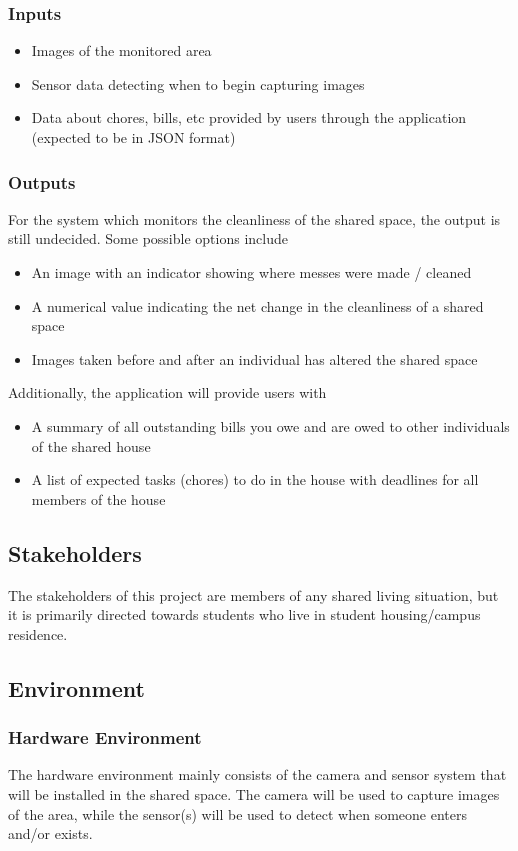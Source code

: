 \documentclass{article}
\begin{document}
\subsubsection{Inputs}
\begin{itemize}
\item Images of the monitored area
\item Sensor data detecting when to begin capturing images
\item Data about chores, bills, etc provided by users through the application (expected to be in JSON format)
\end{itemize}
\subsubsection{Outputs}
For the system which monitors the cleanliness of the shared space, the output is still undecided. Some possible options include
\begin{itemize}
\item An image with an indicator showing where messes were made / cleaned
\item A numerical value indicating the net change in the cleanliness of a shared space
\item Images taken before and after an individual has altered the shared space
\end{itemize}
Additionally, the application will provide users with
\begin{itemize}
\item A summary of all outstanding bills you owe and are owed to other individuals of the shared house
\item A list of expected tasks (chores) to do in the house with deadlines for all members of the house
\end{itemize}
\subsection{Stakeholders}
The stakeholders of this project are members of any shared living situation, but it is
primarily directed towards students who live in student housing/campus residence.

\subsection{Environment}
\subsubsection{Hardware Environment}
The hardware environment mainly consists of the camera and sensor system that will be
installed in the shared space. The camera will be used to capture images of the area, while the
sensor(s) will be used to detect when someone enters and/or exists.
\end{document}
